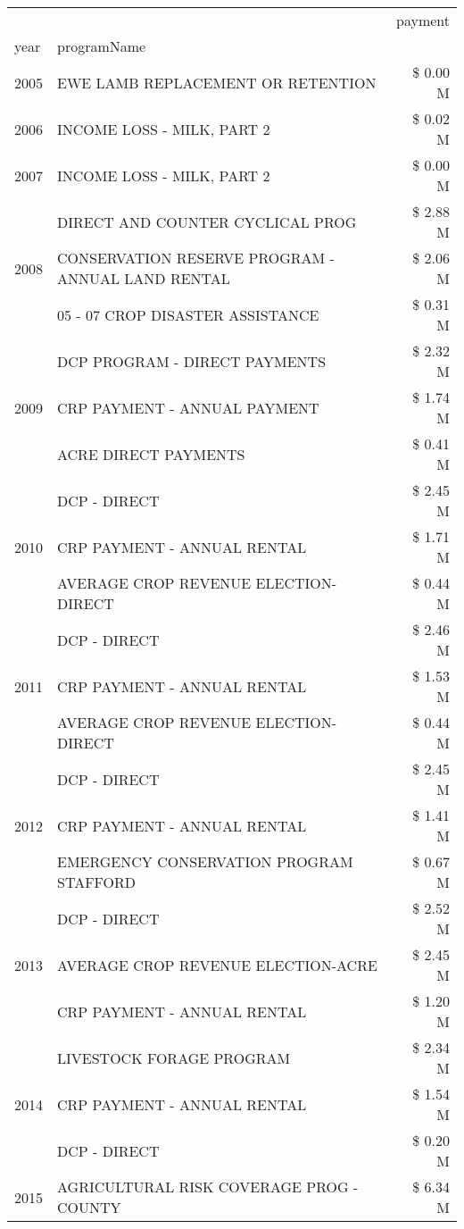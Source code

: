 \begin{tabular}{llr}
\toprule
 &  & payment \\
year & programName &  \\
\midrule
2005 & EWE LAMB REPLACEMENT OR RETENTION & \$ 0.00 M \\
\cline{1-3}
2006 & INCOME LOSS - MILK, PART 2 & \$ 0.02 M \\
\cline{1-3}
2007 & INCOME LOSS - MILK, PART 2 & \$ 0.00 M \\
\cline{1-3}
\multirow[t]{3}{*}{2008} & DIRECT AND COUNTER CYCLICAL PROG & \$ 2.88 M \\
 & CONSERVATION RESERVE PROGRAM - ANNUAL LAND RENTAL & \$ 2.06 M \\
 & 05 - 07 CROP DISASTER ASSISTANCE & \$ 0.31 M \\
\cline{1-3}
\multirow[t]{3}{*}{2009} & DCP PROGRAM - DIRECT PAYMENTS & \$ 2.32 M \\
 & CRP PAYMENT - ANNUAL PAYMENT & \$ 1.74 M \\
 & ACRE DIRECT PAYMENTS & \$ 0.41 M \\
\cline{1-3}
\multirow[t]{3}{*}{2010} & DCP - DIRECT & \$ 2.45 M \\
 & CRP PAYMENT - ANNUAL RENTAL & \$ 1.71 M \\
 & AVERAGE CROP REVENUE ELECTION-DIRECT & \$ 0.44 M \\
\cline{1-3}
\multirow[t]{3}{*}{2011} & DCP - DIRECT & \$ 2.46 M \\
 & CRP PAYMENT - ANNUAL RENTAL & \$ 1.53 M \\
 & AVERAGE CROP REVENUE ELECTION-DIRECT & \$ 0.44 M \\
\cline{1-3}
\multirow[t]{3}{*}{2012} & DCP - DIRECT & \$ 2.45 M \\
 & CRP PAYMENT - ANNUAL RENTAL & \$ 1.41 M \\
 & EMERGENCY CONSERVATION PROGRAM STAFFORD & \$ 0.67 M \\
\cline{1-3}
\multirow[t]{3}{*}{2013} & DCP - DIRECT & \$ 2.52 M \\
 & AVERAGE CROP REVENUE ELECTION-ACRE & \$ 2.45 M \\
 & CRP PAYMENT - ANNUAL RENTAL & \$ 1.20 M \\
\cline{1-3}
\multirow[t]{3}{*}{2014} & LIVESTOCK FORAGE PROGRAM & \$ 2.34 M \\
 & CRP PAYMENT - ANNUAL RENTAL & \$ 1.54 M \\
 & DCP - DIRECT & \$ 0.20 M \\
\cline{1-3}
\multirow[t]{3}{*}{2015} & AGRICULTURAL RISK COVERAGE PROG - COUNTY & \$ 6.34 M \\

\end{tabular}
